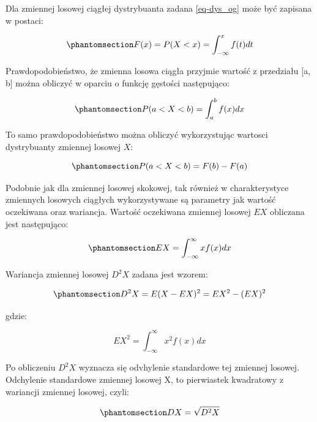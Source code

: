 \documentclass[
  letterpaper,
  DIV=11,
  numbers=noendperiod]{scrreprt}
\begin{document}
Dla zmiennej losowej ciągłej dystrybuanta zadana \ref{eq-dys_og} może
być zapisana w postaci:

\begin{equation}\phantomsection\label{eq-dys_cg}{F(x) = P(X <x) = \int_{-\infty}^x f(t)dt}\end{equation}

Prawdopodobieństwo, że zmienna losowa ciągła przyjmie wartość z
przedziału {[}a, b{]} można obliczyć w oparciu o funkcję gęstości
następująco:

\begin{equation}\phantomsection\label{eq-pr_gest}{ P(a<X<b)= \int_a^b f(x)dx}\end{equation}

To samo prawdopodobieństwo można obliczyć wykorzystując wartosci
dystrybuanty zmiennej losowej \(X\):

\begin{equation}\phantomsection\label{eq-pr_dys}{ P(a<X<b)= F(b) - F(a)}\end{equation}

Podobnie jak dla zmiennej losowej skokowej, tak również w
charakterystyce zmiennych losowych ciągłych wykorzystywane są parametry
jak wartość oczekiwana oraz wariancja. Wartość oczekiwana zmiennej
losowej \(EX\) obliczana jest następująco:

\begin{equation}\phantomsection\label{eq-wo_cg}{ EX = \int_{-\infty}^{\infty} x f(x)dx}\end{equation}

Wariancja zmiennej losowej \(D^2X\) zadana jest wzorem:

\begin{equation}\phantomsection\label{eq-war_cg}{ D^2X = E(X-EX)^2 = EX^2-(EX)^2 }\end{equation}

gdzie:

\[ EX^2 = \int_{-\infty}^{\infty} x^2 f(x)dx\]

Po obliczeniu \(D^2X\) wyznacza się odvhylenie standardowe tej zmiennej
losowej. Odchylenie standardowe zmiennej losowej X, to pierwiastek
kwadratowy z wariancji zmiennej losowej, czyli:

\begin{equation}\phantomsection\label{eq-sd_cg}{ DX=\sqrt{D^2X}}\end{equation}

\begin{tcolorbox}[enhanced jigsaw, toprule=.15mm, title=\textcolor{quarto-callout-tip-color}{\faLightbulb}\hspace{0.5em}{Przykład 4.2. Czas oczekiwania na autobus}, breakable, coltitle=black, titlerule=0mm, colbacktitle=quarto-callout-tip-color!10!white, opacitybacktitle=0.6, opacityback=0, bottomtitle=1mm, left=2mm, arc=.35mm, leftrule=.75mm, bottomrule=.15mm, rightrule=.15mm, toptitle=1mm, colframe=quarto-callout-tip-color-frame, colback=white]

\end{tcolorbox}
\end{document}
